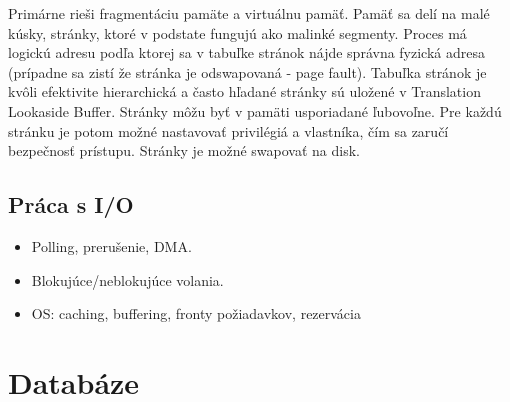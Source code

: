 \documentclass[a4paper,10pt]{article}
\begin{document}
\begin{multicols}{2}
			Primárne rieši fragmentáciu pamäte a virtuálnu pamäť. Pamäť sa delí na malé kúsky, stránky, ktoré v podstate fungujú ako malinké segmenty. Proces má logickú adresu podľa ktorej sa v tabuľke stránok nájde správna fyzická adresa (prípadne sa zistí že stránka je odswapovaná - page fault). Tabuľka stránok je kvôli efektivite hierarchická a často hľadané stránky sú uložené v Translation Lookaside Buffer. Stránky môžu byť v pamäti usporiadané ľubovoľne. Pre každú stránku je potom možné nastavovať privilégiá a vlastníka, čím sa zaručí bezpečnosť prístupu. Stránky je možné swapovať na disk.

	\subsection{Práca s I/O}
		
		\begin{itemize}
			\item Polling, prerušenie, DMA.
			\item Blokujúce/neblokujúce volania.
			\item OS: caching, buffering, fronty požiadavkov, rezervácia
		\end{itemize}

\end{multicols}

\section{Databáze}

\begin{multicols}{2}



\end{multicols}
\end{document}
